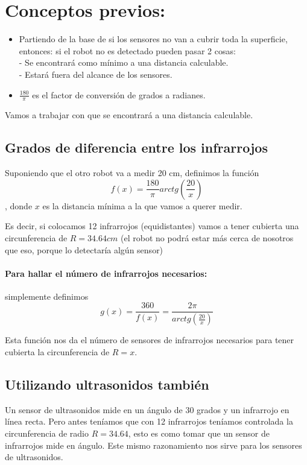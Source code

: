 \documentclass[a4paper,10pt]{article}
\title{}
\author{}
\newcommand{\rtg}{\frac{180}{\pi}}
\begin{document}
\section{Conceptos previos: }
\begin{itemize}
 \item Partiendo de la base de si los sensores no van a cubrir toda la superficie, entonces: si el robot no es detectado pueden pasar 2 cosas: \\
 - Se encontrará como mínimo a una distancia calculable.\\
 - Estará fuera del alcance de los sensores.
 \item $\frac{180}{\pi}$ es el factor de conversión de grados a radianes.
\end{itemize}
Vamos a trabajar con que se encontrará a una distancia calculable.

\subsection{Grados de diferencia entre los infrarrojos}

Suponiendo que el otro robot va a medir 20 cm, definimos la función \[f(x) = \rtg arctg\left(\frac{20}{x}\right)\], donde $x$ es la distancia mínima a la que vamos a querer medir. 

Es decir, si colocamos 12 infrarrojos (equidistantes) vamos a tener cubierta una circunferencia de $R = 34.64cm$ (el robot no podrá estar más cerca de nosotros que eso, porque lo detectaría algún sensor)

\paragraph{Para hallar el número de infrarrojos necesarios:} simplemente definimos 
\[g(x) = \frac{360}{f(x)} = \frac{2\pi}{arctg\left(\frac{20}{x}\right)}\]

Esta función nos da el número de sensores de infrarrojos necesarios para tener cubierta la circunferencia de $R = x$.

\subsection{Utilizando ultrasonidos también}

Un sensor de ultrasonidos mide en un ángulo de $30$ grados y un infrarrojo en línea recta. Pero antes teníamos que con 12 infrarrojos teníamos controlada la circunferencia de radio $R = 34.64$, esto es como tomar que un sensor de infrarrojos mide en ángulo. Este mismo razonamiento nos sirve para los sensores de ultrasonidos. 
\end{document}
